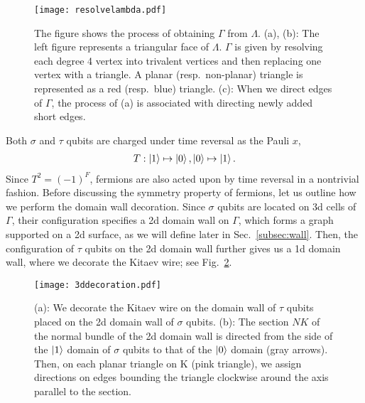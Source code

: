 \documentclass[12pt]{article}
\numberwithin{equation}{section}
\begin{document}
\begin{figure}[htb]
\centering
\texttt{[image: resolvelambda.pdf]}
\caption{The figure shows the process of obtaining $\Gamma$ from $\Lambda$. (a), (b): The left figure represents a triangular face of $\Lambda$.
$\Gamma$ is given by resolving each degree 4 vertex into trivalent vertices and then replacing one vertex with a triangle. A planar (resp.~non-planar) triangle is represented as a red (resp.~blue) triangle. (c): When we direct edges of $\Gamma$, the process of (a) is associated with directing newly added short edges.}
\label{fig:resolve}
\end{figure}
Both $\sigma$ and $\tau$ qubits are charged under time reversal as the Pauli $x$,
\begin{align}
    T: \ket{1}\mapsto\ket{0}, \ket{0}\mapsto\ket{1}.
    \label{eq:tqubit}
\end{align}
Since $T^2=(-1)^F$, fermions are also acted upon by time reversal in a nontrivial fashion. Before discussing the symmetry property of fermions, let us outline how we perform the domain wall decoration. 
Since $\sigma$ qubits are located on 3d cells of $\Gamma$, their configuration specifies a 2d domain wall on $\Gamma$, which forms a graph supported on a 2d surface, as we will define later in Sec.~\ref{subsec:wall}. Then, the configuration of $\tau$ qubits on the 2d domain wall further gives us a 1d domain wall, where we decorate the Kitaev wire; see Fig.~\ref{fig:3ddeco}. 


\begin{figure}[htb]
\centering
\texttt{[image: 3ddecoration.pdf]}
\caption{(a): We decorate the Kitaev wire on the domain wall of $\tau$ qubits placed on the 2d domain wall of $\sigma$ qubits. (b): The section $NK$ of the normal bundle of the 2d domain wall is directed from the side of the $\ket{1}$ domain of $\sigma$ qubits to that of the $\ket{0}$ domain (gray arrows). 
Then, on each planar triangle on $\mathrm{K}$ (pink triangle), we assign directions on edges bounding the triangle clockwise around the axis parallel to the section. }
\label{fig:3ddeco}
\end{figure}
\end{document}
